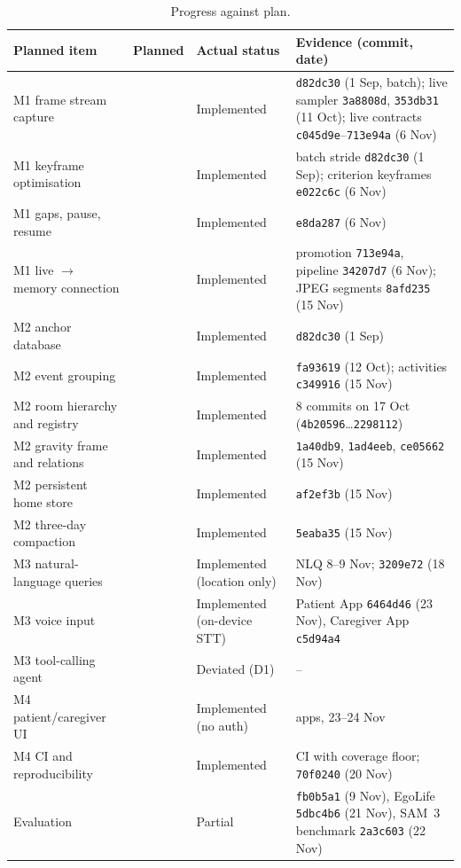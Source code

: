 \begin{table}[H]\centering\footnotesize
\caption{Progress against plan.}\label{tab:progress}
\begin{tabularx}{\textwidth}{@{}L{3.4cm} L{1.4cm} L{2.4cm} Y@{}}\toprule
{}\textbf{Planned item}&\textbf{Planned}&\textbf{Actual status}&\textbf{Evidence (commit, date)}\\\midrule
M1 frame stream capture&\tbd{[ ]}&Implemented&\texttt{d82dc30} (1 Sep, batch); live sampler \texttt{3a8808d}, \texttt{353db31} (11 Oct); live contracts \texttt{c045d9e}--\texttt{713e94a} (6 Nov)\\
M1 keyframe optimisation&\tbd{[ ]}&Implemented&batch stride \texttt{d82dc30} (1 Sep); criterion keyframes \texttt{e022c6c} (6 Nov)\\
M1 gaps, pause, resume&\tbd{[ ]}&Implemented&\texttt{e8da287} (6 Nov)\\
M1 live $\rightarrow$ memory connection&\tbd{[ ]}&Implemented&promotion \texttt{713e94a}, pipeline \texttt{34207d7} (6 Nov); JPEG segments \texttt{8afd235} (15 Nov)\\
M2 anchor database&\tbd{[ ]}&Implemented&\texttt{d82dc30} (1 Sep)\\
M2 event grouping&\tbd{[ ]}&Implemented&\texttt{fa93619} (12 Oct); activities \texttt{c349916} (15 Nov)\\
M2 room hierarchy and registry&\tbd{[ ]}&Implemented&8 commits on 17 Oct (\texttt{4b20596}\ldots\texttt{2298112})\\
M2 gravity frame and relations&\tbd{[ ]}&Implemented&\texttt{1a40db9}, \texttt{1ad4eeb}, \texttt{ce05662} (15 Nov)\\
M2 persistent home store&\tbd{[ ]}&Implemented&\texttt{af2ef3b} (15 Nov)\\
M2 three-day compaction&\tbd{[ ]}&Implemented&\texttt{5eaba35} (15 Nov)\\
M3 natural-language queries&\tbd{[ ]}&Implemented (location only)&NLQ 8--9 Nov;  \texttt{3209e72} (18 Nov)\\
M3 voice input&\tbd{[ ]}&Implemented (on-device STT)&Patient App \texttt{6464d46} (23 Nov), Caregiver App \texttt{c5d94a4}\\
M3 tool-calling agent&\tbd{[ ]}&Deviated (D1)&--\\
M4 patient/caregiver UI&\tbd{[ ]}&Implemented (no auth)&apps, 23--24 Nov\\
M4 CI and reproducibility&\tbd{[ ]}&Implemented&CI with coverage floor;  \texttt{70f0240} (20 Nov)\\
Evaluation&\tbd{[ ]}&Partial&\texttt{fb0b5a1} (9 Nov), EgoLife \texttt{5dbc4b6} (21 Nov), SAM~3 benchmark \texttt{2a3c603} (22 Nov)\\
\bottomrule\end{tabularx}\end{table}


